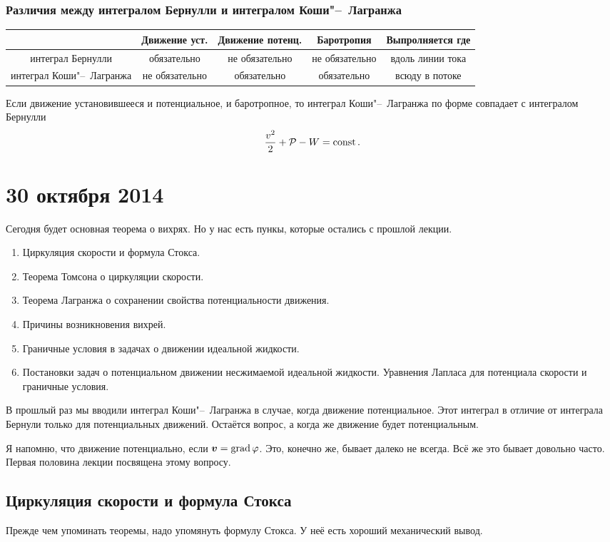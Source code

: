 \subsubsection{Различия между интегралом Бернулли и интегралом Коши"--~Лагранжа}
\begin{tabular}{|c|c|c|c|c|}
\hline
			 	& Движение уст. & Движение потенц. & Баротропия & Выпролняется где \\\hline
 интеграл Бернулли 		& обязательно		  & не обязательно	   & не обязательно& вдоль линии тока\\\hline
 интеграл Коши"--~Лагранжа 	& не обязательно	  & обязательно		   & обязательно& всюду в потоке\\\hline
\end{tabular}
Если движение установившееся и потенциальное, и баротропное, то интеграл Коши"--~Лагранжа по форме совпадает с интегралом Бернулли
\[
  \frac{v^2}{2}+\mathcal P- W = \operatorname{const}.
\]

\section{30 октября 2014}
Сегодня будет основная теорема о вихрях. Но у нас есть пункы, которые остались с прошлой лекции.
\begin{enumerate}
  \item Циркуляция скорости и формула Стокса.
  \item Теорема Томсона о циркуляции скорости.
  \item Теорема Лагранжа о сохранении свойства потенциальности движения.
  \item Причины возникновения вихрей.
  \item Граничные условия в задачах о движении идеальной жидкости.
  \item Постановки задач о потенциальном движении несжимаемой идеальной жидкости. Уравнения Лапласа для потенциала скорости и граничные условия.
\end{enumerate}

В прошлый раз мы вводили интеграл Коши"--~Лагранжа в случае, когда движение потенциальное. Этот интеграл в отличие от интеграла Бернули только для потенциальных движений. Остаётся вопрос, а когда же движение будет потенциальным.

Я напомню, что движение потенциально, если $\boldsymbol{v}= \operatorname{grad} \varphi$. Это, конечно же, бывает далеко не всегда. Всё же это бывает довольно часто. Первая половина лекции посвящена этому вопросу.
\subsection{Циркуляция скорости и формула Стокса}
Прежде чем упоминать теоремы, надо упомянуть формулу Стокса. У неё есть хороший механический вывод.

